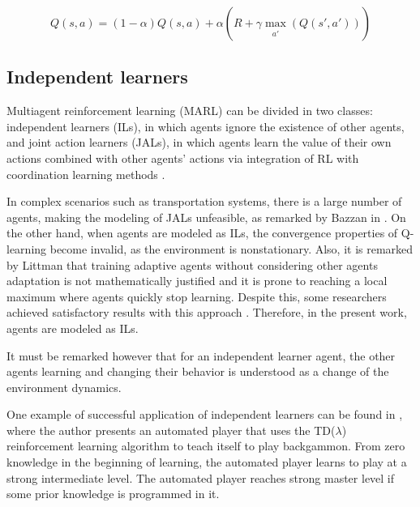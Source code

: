 \documentclass{RITA}
\begin{document}
\begin{equation}
\label{eq:qlearning}
Q(s,a) = (1 - \alpha) Q(s,a) + \alpha (R + \gamma \max_{\substack{a'}}(Q(s',a')))
\end{equation}


\subsection{Independent learners} 
\label{sec:il}
Multiagent reinforcement learning (MARL) can be divided in two classes: independent learners (ILs), in which agents ignore the existence of other agents, and joint action learners (JALs), in which agents learn the value of their own actions combined with other agents' actions via integration of RL with coordination learning methods \cite{Claus&Boutilier1998}. 

In complex scenarios such as transportation systems, there is a large number of agents, making the modeling of JALs unfeasible, as remarked by Bazzan in \cite{Bazzan2009}. On the other hand, when agents are modeled as ILs, the convergence properties of Q-learning become invalid, as the environment is nonstationary. Also, it is remarked by Littman \cite{Littman1994} that training adaptive agents without considering other agents adaptation is not mathematically justified and it is prone to reaching a local maximum where agents quickly stop learning. Despite this, some researchers achieved satisfactory results with this approach \cite{Littman1994}. Therefore, in the present work, agents are modeled as ILs.

It must be remarked however that for an independent learner agent, the other agents learning and changing their behavior is understood as a change of the environment dynamics.  %

One example of successful application of independent learners can be found in \cite{Tesauro1994}, where the author presents an automated player that uses the TD($\lambda$) reinforcement learning algorithm \cite{Sutton1988} to teach itself to play backgammon. From zero knowledge in the beginning of learning, the automated player learns to play at a strong intermediate level. The automated player reaches strong master level if some prior knowledge is programmed in it. 
\end{document}
